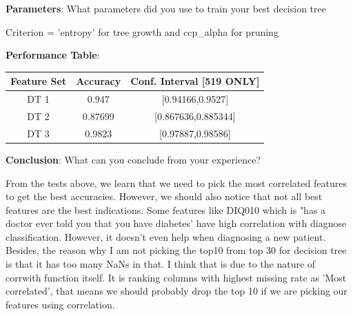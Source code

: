\documentclass{article}
\begin{document}
        \noindent\textbf{Parameters}: What parameters did you use to train your best decision tree
        
        Criterion = 'entropy'  for tree growth and ccp\_alpha for pruning
        
        \noindent\textbf{Performance Table}: 
        \begin{center}
            \begin{tabular}{|c|c|c|}
                \hline
                Feature Set & Accuracy & Conf. Interval [519 ONLY]\\
                \hline
                DT 1 & 0.947 & [0.94166,0.9527]  \\
                DT 2 & 0.87699 & [0.867636,0.885344]  \\
                DT 3 & 0.9823 &  [0.97887,0.98586] \\
                \hline
        \end{tabular}
                \end{center}
        
        
        
        \textbf{Conclusion}: What can you conclude from your experience?
        
        From the tests above, we learn that we need to pick the most correlated features to get the best accuracies. However, we should also notice that not all best features are the best indications. Some features like DIQ010 which is "has a doctor ever told you that you have diabetes' have high correlation with diagnose classification. However, it doesn't even help when diagnosing a new patient. Besides, the reason why I am not picking the top10 from top 30 for decision tree is that it has too many NaNs in that. I think that is due to the nature of corrwith function itself. It is ranking columns with highest missing rate as 'Most correlated', that means we should probably drop the top 10 if we are picking our features using correlation.
\end{document}

